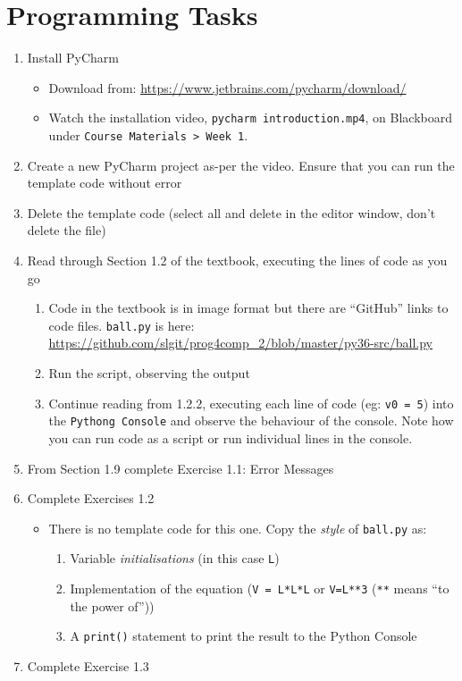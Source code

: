 \documentclass{lab}
\begin{document}
\section{Programming Tasks}

\begin{enumerate}
\item Install PyCharm
	\begin{itemize}
		\item Download from: \url{https://www.jetbrains.com/pycharm/download/}
		\item Watch the installation video, \texttt{pycharm introduction.mp4}, on Blackboard under \texttt{Course Materials > Week 1}.
	\end{itemize}
\item Create a new PyCharm project as-per the video. Ensure that you can run the template code without error
\item Delete the template code (select all and delete in the editor window, don't delete the file)
\item Read through Section 1.2 of the textbook, executing the lines of code as you go
	\begin{enumerate}
		\item Code in the textbook is in image format but there are ``GitHub'' links to code files. \texttt{ball.py} is here: \url{https://github.com/slgit/prog4comp_2/blob/master/py36-src/ball.py}
		\item Run the script, observing the output
		\item Continue reading from 1.2.2, executing each line of code (eg: \texttt{v0 = 5}) into the \texttt{Pythong Console} and observe the behaviour of the console. Note how you can run code as a script or run individual lines in the console.
	\end{enumerate}
\item From Section 1.9 complete Exercise 1.1: Error Messages
\item Complete Exercises 1.2
	\begin{itemize}
		\item There is no template code for this one. Copy the \textit{style} of \texttt{ball.py} as:
			\begin{enumerate}
				\item Variable \textit{initialisations} (in this case \texttt{L})
				\item Implementation of the equation (\texttt{V = L*L*L} or \texttt{V=L**3} (\texttt{**} means ``to the power of''))
				\item A \texttt{print()} statement to print the result to the Python Console
			\end{enumerate}
	\end{itemize}
\item Complete Exercise 1.3
\end{enumerate}
\end{document}
